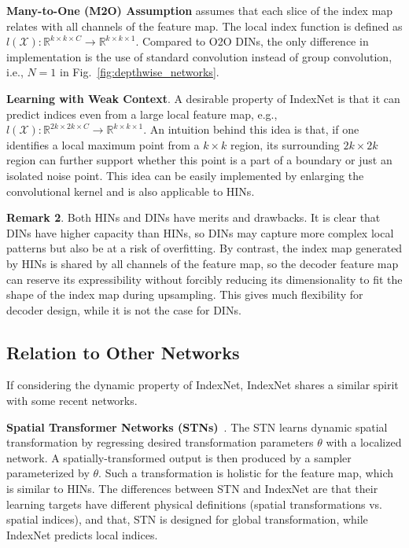 \documentclass[10pt,twocolumn,letterpaper]{article}
\begin{document}
\vspace{3pt}
\noindent\textbf{Many-to-One (M2O) Assumption} assumes that each slice of the index map relates with all channels of the feature map. The local index function is defined as $l(\mathcal{X}): \mathbb{R}^{k\times k\times C}\rightarrow\mathbb{R}^{k\times k\times1}$. Compared to O2O DINs, the only difference in implementation is the use of standard convolution instead of group convolution, i.e., $N=1$ in Fig.~\ref{fig:depthwise_networks}.

\vspace{3pt}
\noindent\textbf{Learning with Weak Context}. A desirable property of IndexNet is that it can predict indices even from a large local feature map, e.g., $l(\mathcal{X}): \mathbb{R}^{2k\times 2k\times C}\rightarrow\mathbb{R}^{k\times k\times1}$. An intuition behind this idea is that, if one identifies a local maximum point from a $k\times k$ region, its surrounding $2k\times2k$ region can further support whether this point is a part of a boundary or just an isolated noise point. This idea can be easily implemented by enlarging the convolutional kernel and is also applicable to HINs.

\vspace{3pt}
\noindent\textbf{Remark 2}. Both HINs and DINs have merits and drawbacks. It is clear that DINs have higher capacity than HINs, so DINs may capture more complex local patterns but also be at a risk of overfitting. By contrast, the index map generated by HINs is shared by all channels of the feature map, so the decoder feature map can reserve its expressibility without forcibly reducing its dimensionality to fit the shape of the index map during upsampling. This gives much flexibility for decoder design, while it is not the case for DINs.

\subsection{Relation to Other Networks}

If considering the dynamic property of IndexNet, \mbox{IndexNet} shares a similar spirit with some recent networks.

\vspace{3pt}
\noindent\textbf{Spatial Transformer Networks (STNs)}~\cite{jaderberg2015spatial}. The STN learns dynamic spatial transformation by regressing desired transformation parameters $\theta$ with a localized network. A spatially-transformed output is then produced by a sampler parameterized by $\theta$. Such a transformation is holistic for the feature map, which is similar to HINs. The differences between STN and IndexNet are that their learning targets have different physical definitions (spatial transformations vs. spatial indices), and that, STN is designed for global transformation, while IndexNet predicts local indices.
\end{document}
